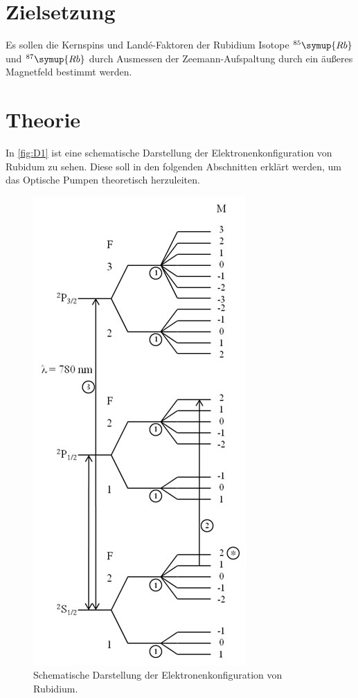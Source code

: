\section{Zielsetzung}
\label{sec:Zielsetzung}
Es sollen die Kernspins und Land\'e-Faktoren der Rubidium Isotope $^{85}\symup{Rb}$ und $^{87}\symup{Rb}$
durch Ausmessen der Zeemann-Aufspaltung durch ein äußeres Magnetfeld bestimmt werden.

\section{Theorie}
\label{sec:Theorie}
In \autoref{fig:D1} ist eine schematische Darstellung der Elektronenkonfiguration von Rubidum zu sehen.
Diese soll in den folgenden Abschnitten erklärt werden, um das Optische Pumpen theoretisch herzuleiten.

\begin{figure}
    \centering
    \includegraphics[scale=0.5]{zeeman_splitting.jpg}
    \caption{Schematische Darstellung der Elektronenkonfiguration von Rubidium.\cite{D1}}
    \label{fig:D1}
\end{figure}

